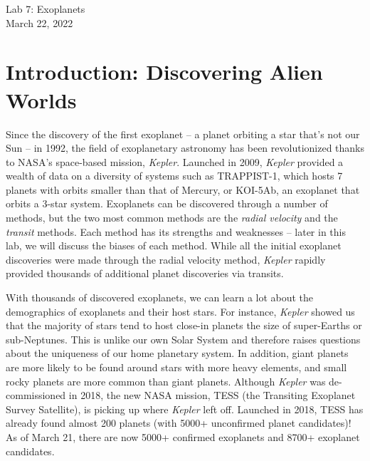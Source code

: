 \documentclass[11pt]{article}
\begin{document}
\begin{center}
\huge{Lab 7: Exoplanets}\\ \medskip \Large{March 22, 2022}
\end{center}

\section{Introduction: Discovering Alien Worlds}

Since the discovery of the first exoplanet -- a planet orbiting a star that's not our Sun -- in 1992, the field of exoplanetary astronomy has been revolutionized thanks to NASA's space-based mission, \textit{Kepler}. Launched in 2009, \textit{Kepler} provided a wealth of data on a diversity of systems such as TRAPPIST-1, which hosts 7 planets with orbits smaller than that of Mercury, or KOI-5Ab, an exoplanet that orbits a 3-star system. Exoplanets can be discovered through a number of methods, but the two most common methods are the \textit{radial velocity} and the \textit{transit} methods. Each method has its strengths and weaknesses -- later in this lab, we will discuss the biases of each method. While all the initial exoplanet discoveries were made through the radial velocity method, \textit{Kepler} rapidly provided thousands of additional planet discoveries via transits.  

\medskip \noindent
With thousands of discovered exoplanets, we can learn a lot about the demographics of exoplanets and their host stars. For instance, \textit{Kepler} showed us that the majority of stars tend to host close-in planets the size of super-Earths or sub-Neptunes. This is unlike our own Solar System and therefore raises questions about the uniqueness of our home planetary system. In addition, giant planets are more likely to be found around stars with more heavy elements, and small rocky planets are more common than giant planets. Although \textit{Kepler} was de-commissioned in 2018, the new NASA mission, TESS (the Transiting Exoplanet Survey Satellite), is picking up where \textit{Kepler} left off. Launched in 2018, TESS has already found almost 200 planets (with 5000+ unconfirmed planet candidates)! As of March 21, there are now 5000+ confirmed exoplanets and 8700+ exoplanet candidates.
\end{document}
